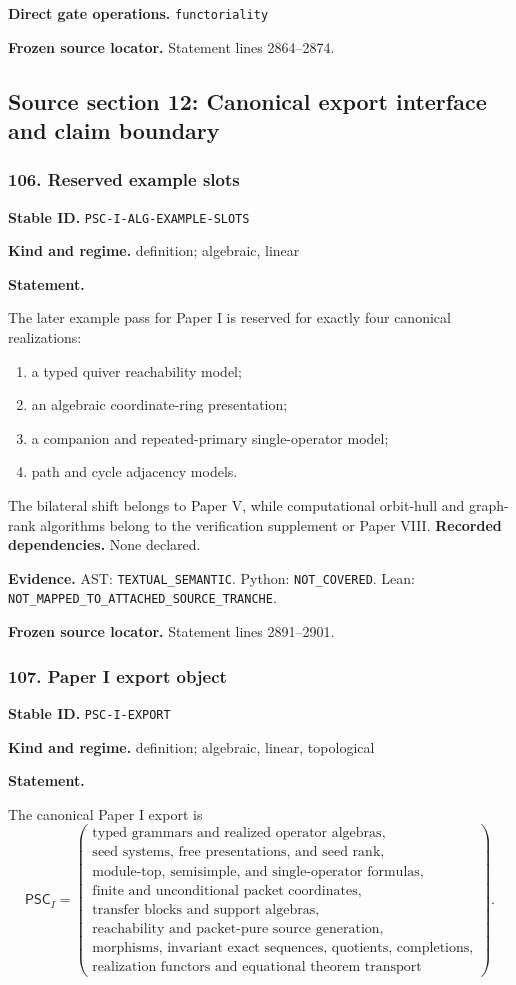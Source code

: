 \documentclass[a4paper,11pt]{article}
\newcommand{\field}[2]{\noindent\textbf{#1.} #2\par}
\begin{document}
\field{Direct gate operations}{\nolinkurl{functoriality}}
\field{Frozen source locator}{Statement lines 2864--2874.}
\clearpage\subsection{Source section 12: Canonical export interface and claim boundary}
\subsubsection*{106. Reserved example slots}
\label{rec:PSC-I-ALG-EXAMPLE-SLOTS}
\field{Stable ID}{\nolinkurl{PSC-I-ALG-EXAMPLE-SLOTS}}
\field{Kind and regime}{definition; algebraic, linear}
\textbf{Statement.}\par
The later example pass for Paper I is reserved for exactly four canonical realizations:
\begin{enumerate}[label=(\roman*)]
\item a typed quiver reachability model;
\item an algebraic coordinate-ring presentation;
\item a companion and repeated-primary single-operator model;
\item path and cycle adjacency models.
\end{enumerate}
The bilateral shift belongs to Paper V, while computational orbit-hull and graph-rank algorithms belong to the verification supplement or Paper VIII.
\field{Recorded dependencies}{None declared.}
\field{Evidence}{AST: \nolinkurl{TEXTUAL_SEMANTIC}. Python: \nolinkurl{NOT_COVERED}. Lean: \nolinkurl{NOT_MAPPED_TO_ATTACHED_SOURCE_TRANCHE}.}
\field{Frozen source locator}{Statement lines 2891--2901.}
\subsubsection*{107. Paper I export object}
\label{rec:PSC-I-EXPORT}
\field{Stable ID}{\nolinkurl{PSC-I-EXPORT}}
\field{Kind and regime}{definition; algebraic, linear, topological}
\textbf{Statement.}\par
The canonical Paper I export is
\[
\boxed{
\mathsf{PSC}_I=
\left(
\begin{array}{c}
\text{typed grammars and realized operator algebras},\\
\text{seed systems, free presentations, and seed rank},\\
\text{module-top, semisimple, and single-operator formulas},\\
\text{finite and unconditional packet coordinates},\\
\text{transfer blocks and support algebras},\\
\text{reachability and packet-pure source generation},\\
\text{morphisms, invariant exact sequences, quotients, completions},\\
\text{realization functors and equational theorem transport}
\end{array}
\right).
}
\]
\end{document}
